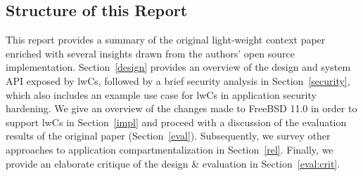 \documentclass[10pt,twocolumn,a4paper]{article}
\begin{document}
\subsection{Structure of this Report}
This report provides a summary of the original light-weight context paper enriched with several insights drawn from the authors' open source implementation.
Section~\ref{design} provides an overview of the design and system API exposed by lwCs,
followed by a brief security analysis in Section~\ref{security}, which also includes an example use case for lwCs in application security hardening.
We give an overview of the changes made to FreeBSD 11.0 in order to support lwCs in Section~\ref{impl} and proceed with a discussion of the evaluation results of the original paper (Section~\ref{eval}).
Subsequently, we survey other approaches to application compartmentalization in Section~\ref{rel}.
Finally, we provide an elaborate critique of the design \& evaluation in Section~\ref{eval:crit}.
\end{document}
